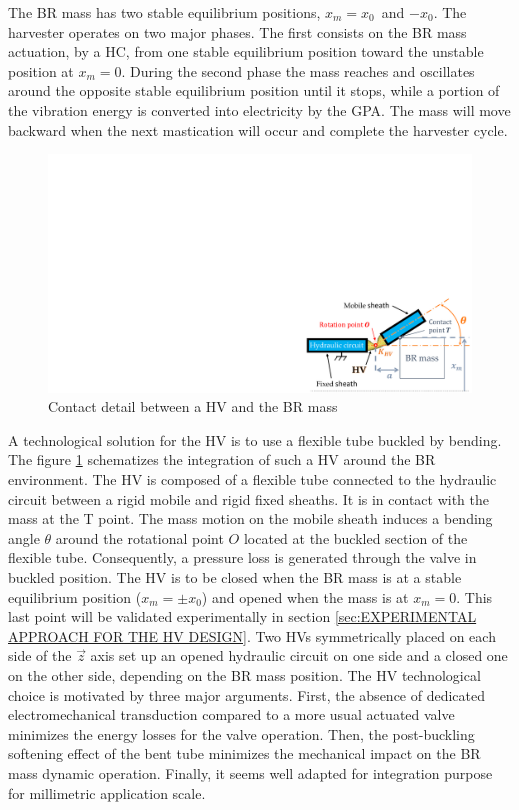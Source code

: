 \documentclass[3p,twocolumn,preprint]{elsarticle}
\begin{document}
The BR mass has two stable equilibrium positions, \mbox{$x_m = x_0$ }and \mbox{$-x_0$}. The harvester operates on two major phases. The first consists on the BR mass actuation, by a HC, from one stable equilibrium position toward the unstable position at $x_m = 0$. During the second phase the mass reaches and oscillates around the opposite stable equilibrium position until it stops, while a portion of the vibration energy is converted into electricity by the GPA. The mass will move backward when the next mastication will occur and complete the harvester cycle.
\begin{figure}[!htbp]
	\centering
	\captionsetup{justification=centering}
	\includegraphics[trim={20.5cm 0cm 0cm 11.5cm},clip, width=0.8\linewidth]{figures/HV_actuation_detail.pdf}
	\caption{Contact detail between a HV and the BR mass} 
	\label{fig:HV_actuation_detail}
\end{figure}

A technological solution for the HV is to use a flexible tube buckled by bending. The figure \ref{fig:HV_actuation_detail} schematizes the integration of such a HV around the BR environment. The HV is composed of a flexible tube connected to the hydraulic circuit between a rigid mobile and rigid fixed sheaths. It is in contact with the mass at the T point. The mass motion on the mobile sheath induces a bending angle $\theta$ around the rotational point $O$ located at the buckled section of the flexible tube. Consequently, a pressure loss is generated through the valve in buckled position. The HV is to be closed when the BR mass is at a stable equilibrium position ($x_m=\pm x_0$) and opened when the mass is at $x_m=0$. This last point will be validated experimentally in section \ref{sec:EXPERIMENTAL APPROACH FOR THE HV DESIGN}. Two HVs symmetrically placed on each side of the $\vec{z}$ axis set up an opened hydraulic circuit on one side and a closed one on the other side, depending on the BR mass position. The HV technological choice is motivated by three major arguments. First, the absence of dedicated electromechanical transduction compared to a more usual actuated valve minimizes the energy losses for the valve operation. Then, the post-buckling softening effect of the bent tube minimizes the mechanical impact on the BR mass dynamic operation. Finally, it seems well adapted for integration purpose for millimetric application scale.
\end{document}
